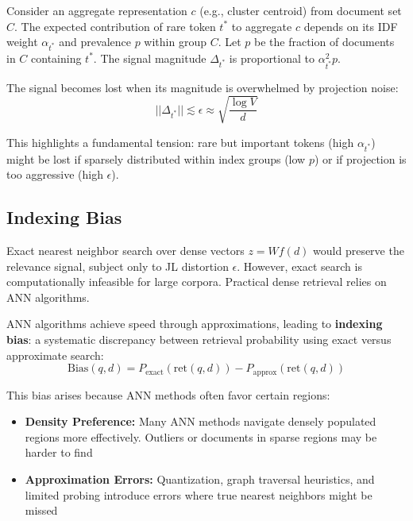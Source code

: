 \documentclass[conference,anonymous]{IEEEtran}
\begin{document}
Consider an aggregate representation $c$ (e.g., cluster centroid) from document set $C$. The expected contribution of rare token $t^*$ to aggregate $c$ depends on its IDF weight $\alpha_{t^*}$ and prevalence $p$ within group $C$. Let $p$ be the fraction of documents in $C$ containing $t^*$. The signal magnitude $\Delta_{t^*}$ is proportional to $\alpha_{t^*}^2 p$.

The signal becomes lost when its magnitude is overwhelmed by projection noise:
\begin{equation}
||\Delta_{t^*}|| \lesssim \epsilon \approx \sqrt{\frac{\log V}{d}}
\label{eq:signal_loss_general}
\end{equation}

This highlights a fundamental tension: rare but important tokens (high $\alpha_{t^*}$) might be lost if sparsely distributed within index groups (low $p$) or if projection is too aggressive (high $\epsilon$).

\subsection{Indexing Bias}

Exact nearest neighbor search over dense vectors $z = Wf(d)$ would preserve the relevance signal, subject only to JL distortion $\epsilon$. However, exact search is computationally infeasible for large corpora. Practical dense retrieval relies on ANN algorithms.

ANN algorithms achieve speed through approximations, leading to \textbf{indexing bias}: a systematic discrepancy between retrieval probability using exact versus approximate search:
\begin{equation}
\text{Bias}(q, d) = P_{\text{exact}}(\text{ret}(q, d)) - P_{\text{approx}}(\text{ret}(q, d))
\label{eq:indexing_bias}
\end{equation}

This bias arises because ANN methods often favor certain regions:
\begin{itemize}
    \item \textbf{Density Preference:} Many ANN methods navigate densely populated regions more effectively. Outliers or documents in sparse regions may be harder to find
    
    \item \textbf{Approximation Errors:} Quantization, graph traversal heuristics, and limited probing introduce errors where true nearest neighbors might be missed
\end{itemize}
\end{document}

